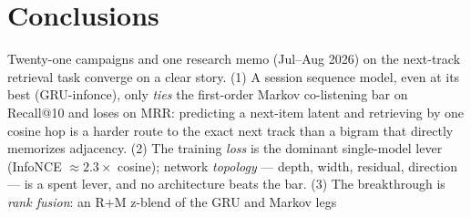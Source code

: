 \documentclass[11pt]{article}
\begin{document}
\section{Conclusions}
\label{sec:conclusions}
Twenty-one campaigns and one research memo (Jul--Aug 2026) on the next-track
retrieval task converge on a clear
story. (1) A session sequence model, even at its best (GRU-infonce), only
\emph{ties} the first-order Markov co-listening bar on Recall@10 and loses on
MRR: predicting a next-item latent and retrieving by one cosine hop is a harder
route to the exact next track than a bigram that directly memorizes adjacency.
(2) The training \emph{loss} is the dominant single-model lever (InfoNCE
$\approx 2.3\times$ cosine); network \emph{topology} --- depth, width, residual,
direction --- is a spent lever, and no architecture beats the bar. (3) The
breakthrough is \emph{rank fusion}: an R+M z-blend of the GRU and Markov legs
\end{document}
